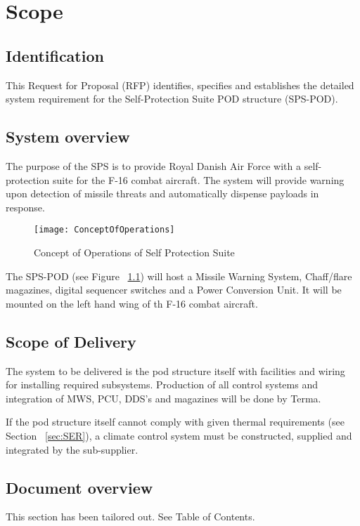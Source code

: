 \documentclass[Main]{subfiles}
\begin{document}
\chapter{Scope}

\section{Identification}
This Request for Proposal (RFP) identifies, specifies and establishes the detailed system requirement for the Self-Protection Suite POD structure (SPS-POD).

\section{System overview}
The purpose of the SPS is to provide Royal Danish Air Force with a self-protection suite for the F-16 combat aircraft. 
The system will provide warning upon detection of missile threats and automatically dispense payloads in response.

\begin{figure}[hbtp]
\centering
\texttt{[image: ConceptOfOperations]}
\caption{Concept of Operations of Self Protection Suite}
\label{fig:conOps}
\end{figure}

The SPS-POD (see Figure ~\ref{fig:conOps}) will host a Missile Warning System, Chaff/flare magazines, digital sequencer switches and a Power Conversion Unit. 
It will be mounted on the left hand wing of th F-16 combat aircraft.

\section{Scope of Delivery}
The system to be delivered is the pod structure itself with facilities and wiring for installing required subsystems. 
Production of all control systems and integration of MWS, PCU, DDS's and magazines will be done by Terma.

If the pod structure itself cannot comply with given thermal requirements (see Section ~\ref{sec:SER}), a climate control system must be constructed, supplied and integrated by the sub-supplier.

\section{Document overview}
This section has been tailored out. See Table of Contents.


\end{document}
